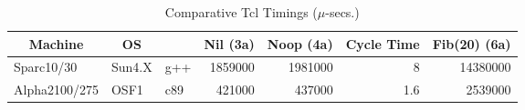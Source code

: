 \begin{table}[p]\centering
\begin{tabular}{|l|l|l|r|r|r|r|}
\hline
\multicolumn{1}{|c}{Machine} &
\multicolumn{1}{|c}{OS} &
\multicolumn{1}{|c}{\CC{}} &
\multicolumn{1}{|c}{Nil (3a)} &
\multicolumn{1}{|c}{Noop (4a)} &
\multicolumn{1}{|c}{Cycle Time} &
\multicolumn{1}{|c|}{Fib(20) (6a)} \\ \hline\hline
Sparc10/30 & Sun4.X & g++ & 1859000 & 1981000 & 8 & 14380000 \\ \hline
Alpha2100/275 & OSF1 & c89 & 421000 & 437000 & 1.6 & 2539000 \\ \hline
\end{tabular}
\caption{Comparative Tcl Timings ($\mu$-secs.)}
\label{tclperf}
\end{table}

\clearpage
{}
\setcounter{page}{1}
\tableofcontents
\newpage
\listoffigures
\newpage
\listoftables

